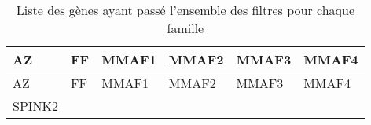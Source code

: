\documentclass[12pt,twoside]{reedthesis}
\theoremstyle{definition}
\theoremstyle{definition}
\theoremstyle{remark}
\begin{document}
  \newpage
  
  \begin{longtable}[]{@{}llllll@{}}
  \caption{\label{tab:tablegene} Liste des gènes ayant passé l'ensemble des
  filtres pour chaque famille}\tabularnewline
  \toprule
  \begin{minipage}[b]{0.08\columnwidth}\raggedright\strut
  AZ\strut
  \end{minipage} & \begin{minipage}[b]{0.07\columnwidth}\raggedright\strut
  FF\strut
  \end{minipage} & \begin{minipage}[b]{0.16\columnwidth}\raggedright\strut
  MMAF1\strut
  \end{minipage} & \begin{minipage}[b]{0.09\columnwidth}\raggedright\strut
  MMAF2\strut
  \end{minipage} & \begin{minipage}[b]{0.09\columnwidth}\raggedright\strut
  MMAF3\strut
  \end{minipage} & \begin{minipage}[b]{0.09\columnwidth}\raggedright\strut
  MMAF4\strut
  \end{minipage}\tabularnewline
  \midrule
  \endfirsthead
  \toprule
  \begin{minipage}[b]{0.08\columnwidth}\raggedright\strut
  AZ\strut
  \end{minipage} & \begin{minipage}[b]{0.07\columnwidth}\raggedright\strut
  FF\strut
  \end{minipage} & \begin{minipage}[b]{0.16\columnwidth}\raggedright\strut
  MMAF1\strut
  \end{minipage} & \begin{minipage}[b]{0.09\columnwidth}\raggedright\strut
  MMAF2\strut
  \end{minipage} & \begin{minipage}[b]{0.09\columnwidth}\raggedright\strut
  MMAF3\strut
  \end{minipage} & \begin{minipage}[b]{0.09\columnwidth}\raggedright\strut
  MMAF4\strut
  \end{minipage}\tabularnewline
  \midrule
  \endhead
  \begin{minipage}[t]{0.08\columnwidth}\raggedright\strut
  SPINK2\strut
  \end{minipage} & \begin{minipage}[t]{0.07\columnwidth}\raggedright\strut

\end{minipage}
\end{longtable}
\end{document}
